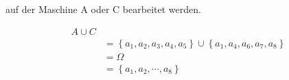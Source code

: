 auf der Maschine A oder C bearbeitet werden.

\begin{align}
	 A \cup C\\
	&= \left\{  a_1, a_2,a_3,a_4,a_5\right\} \cup  \left\{ a_1, a_4, a_6, a_7, a_8 \right\} \\
	& = \Omega \\
	&=\left\{a_1, a_2,\cdots,a_8\right\}
\end{align}